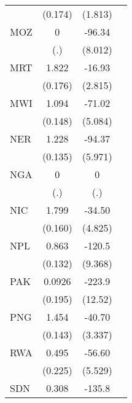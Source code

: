 \begin{table}[htbp]
\begin{tabular}{l*{3}{c}}
                &  (0.174)         &  (1.813)         &                  \\
\addlinespace
MOZ             &        0         &   -96.34\sym{***}&                  \\
                &      (.)         &  (8.012)         &                  \\
\addlinespace
MRT             &    1.822\sym{***}&   -16.93\sym{***}&                  \\
                &  (0.176)         &  (2.815)         &                  \\
\addlinespace
MWI             &    1.094\sym{***}&   -71.02\sym{***}&                  \\
                &  (0.148)         &  (5.084)         &                  \\
\addlinespace
NER             &    1.228\sym{***}&   -94.37\sym{***}&                  \\
                &  (0.135)         &  (5.971)         &                  \\
\addlinespace
NGA             &        0         &        0         &                  \\
                &      (.)         &      (.)         &                  \\
\addlinespace
NIC             &    1.799\sym{***}&   -34.50\sym{***}&                  \\
                &  (0.160)         &  (4.825)         &                  \\
\addlinespace
NPL             &    0.863\sym{***}&   -120.5\sym{***}&                  \\
                &  (0.132)         &  (9.368)         &                  \\
\addlinespace
PAK             &   0.0926         &   -223.9\sym{***}&                  \\
                &  (0.195)         &  (12.52)         &                  \\
\addlinespace
PNG             &    1.454\sym{***}&   -40.70\sym{***}&                  \\
                &  (0.143)         &  (3.337)         &                  \\
\addlinespace
RWA             &    0.495\sym{*}  &   -56.60\sym{***}&                  \\
                &  (0.225)         &  (5.529)         &                  \\
\addlinespace
SDN             &    0.308\sym{*}  &   -135.8\sym{***}&                  \\

\end{tabular}
\end{table}
